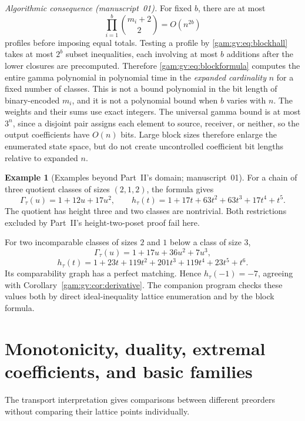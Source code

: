 \documentclass[11pt]{article}
\numberwithin{equation}{section}
\theoremstyle{definition}
\newtheorem{example}[theorem]{Example}%
\begin{document}
\emph{Algorithmic consequence (manuscript~01).} For fixed $b$, there are at most
\begin{equation}
 \prod_{i=1}^b\binom{m_i+2}{2}=O(n^{2b})
 \label{gam:gv:eq:profilestates}
\end{equation}
profiles before imposing equal totals. Testing a profile by
\eqref{gam:gv:eq:blockhall} takes at most $2^b$ subset inequalities, each involving
at most $b$ additions after the lower closures are precomputed. Therefore
\eqref{gam:gv:eq:blockformula} computes the entire gamma polynomial in polynomial
time in the \emph{expanded cardinality} $n$ for a fixed number of classes.
This is not a bound polynomial in the bit length of binary-encoded
$m_i$, and it is not a polynomial bound when $b$ varies with $n$.
The weights and their sums use exact integers. The universal gamma bound
is at most $3^n$, since a disjoint pair assigns each element to source,
receiver, or neither, so the output coefficients have $O(n)$ bits. Large
block sizes therefore enlarge the enumerated state space, but do not create
uncontrolled coefficient bit lengths relative to expanded $n$.

\begin{example}[Examples beyond Part~II's domain; manuscript~01]\label{gam:gv:ex:beyond}
For a chain of three quotient classes of sizes $(2,1,2)$, the formula gives
\[
 \Gamma_\tau(u)=1+12u+17u^2,
 \qquad
 h_\tau(t)=1+17t+63t^2+63t^3+17t^4+t^5.
\]
The quotient has height three and two classes are nontrivial. Both
restrictions excluded by Part~II's height-two-poset proof fail here.

For two incomparable classes of sizes $2$ and $1$ below a class of size $3$,
\[
 \Gamma_\tau(u)=1+17u+36u^2+7u^3,
\]
\[
 h_\tau(t)=1+23t+119t^2+201t^3+119t^4+23t^5+t^6.
\]
Its comparability graph has a perfect matching. Hence
$h_\tau(-1)=-7$, agreeing with Corollary~\ref{gam:gv:cor:derivative}.
The companion program checks these values both by direct ideal-inequality
lattice enumeration and by the block formula.
\end{example}

\section{Monotonicity, duality, extremal coefficients, and basic families}\label{gam:sec:extremal}
The transport interpretation gives comparisons between different preorders
without comparing their lattice points individually.
\end{document}
